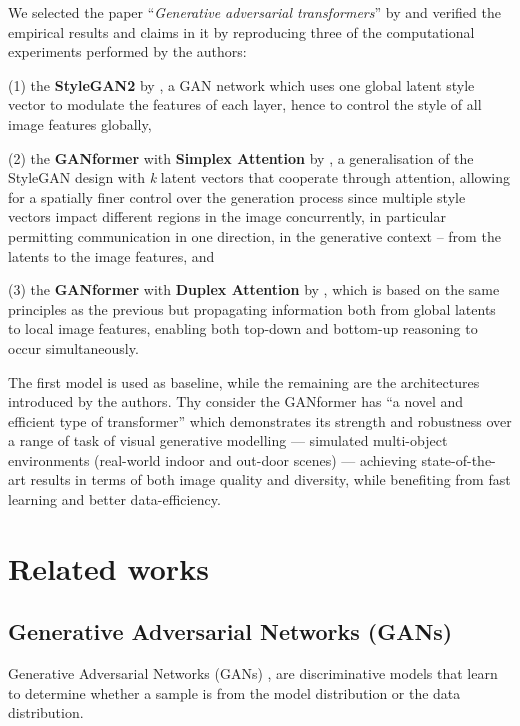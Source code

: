 \documentclass{article}
\begin{document}
	We selected the paper ``\emph{Generative adversarial transformers}'' by 
	\citet{hudson2021generative} and verified the empirical results and claims in it by reproducing three 
	of the computational experiments performed by the authors:
	\begin{enumerate*}
		\item[(1)] the \textbf{StyleGAN2} by \citet{karras2020analyzing}, a GAN network which uses one 
		global latent style vector to modulate the features of each layer, hence to control the style of all 
		image features globally,
		\item[(2)] the \textbf{GANformer} with \textbf{Simplex Attention} by 
		\citet{hudson2021generative}, a generalisation of the StyleGAN design with \textit{k} latent 
		vectors that cooperate through attention, allowing for a spatially finer control over the generation 
		process since multiple style vectors impact different regions in the image concurrently, in 
		particular permitting communication in one direction, in the generative context – from the latents 
		to the image features, and
		\item[(3)] the \textbf{GANformer} with \textbf{Duplex Attention} by \citet{hudson2021generative}, 
		which is based on the same principles as the previous but propagating information both from 
		global latents to local image features, enabling both top-down and bottom-up reasoning to occur 
		simultaneously.
	\end{enumerate*} 
	
	The first model is used as baseline, while the remaining are the architectures introduced by the 
	authors. Thy consider the GANformer has ``a novel and efficient type of transformer'' which 
	demonstrates its strength and robustness over a range of task of visual generative modelling —  
	simulated multi-object environments (real-world indoor and out-door scenes) — achieving 
	state-of-the-art results in terms of both image quality and diversity, while benefiting from fast 
	learning and better data-efficiency. 
	

	\section{Related works}	
	
	\subsection{Generative Adversarial Networks (GANs)}
	Generative Adversarial Networks (GANs) \cite{goodfellow2014generative}, are discriminative models 
	that learn to determine whether a sample is from the model distribution or the data distribution. 
	
\end{document}
